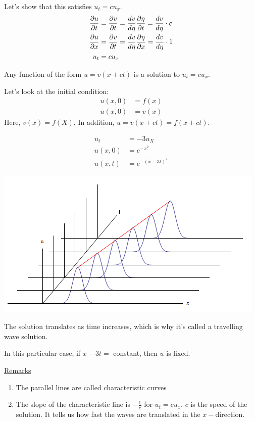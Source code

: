 \documentclass{article}
\begin{document}
  Let's show that this satisfies $u_t = cu_x$.
  \begin{align}
    \frac{\partial u}{\partial t} & = \frac{\partial v}{\partial t} = \frac{dv}{d\eta} \frac{\partial \eta}{\partial t} = \frac{dv}{d \eta} \cdot c\\
    \frac{\partial u}{\partial x} & = \frac{\partial v}{\partial t} = \frac{dv}{d \eta} \frac{\partial \eta}{\partial x} = \frac{dv}{d \eta} \cdot 1\\
    u_t & = cu_x
  \end{align}

  Any function of the form $u = v(x + ct)$ is a solution to $u_t = cu_x$.

  Let's look at the initial condition:
  \begin{align}
    u(x, 0) & = f(x)\\
    u(x, 0) & = v(x)
  \end{align}
  Here, $v(x) = f(X)$. In addition, $u = v(x + ct) = f(x + ct)$.

  \ex%
  \begin{align}
    u_t & = -3u_X\\
    u(x, 0) & = e^{-x^2}\\
    u(x, t) & = e^{-(x - 3t)^2}
  \end{align}

\begin{center}
  \includegraphics{Transport Equation}
\end{center}

The solution translates as time increases, which is why it's called a travelling wave solution.

In this particular case, if $x - 3t = $ constant, then $u$ is fixed.

\underline{Remarks}
%
\begin{enumerate}
  \item The parallel lines are called characteristic curves
  \item The slope of the characteristic line is $-\frac{1}{c}$ for $u_t = cu_x$.
  $c$ is the speed of the solution.
  It tells us how fast the waves are translated in the $x-$direction.
\end{enumerate}
\end{document}
